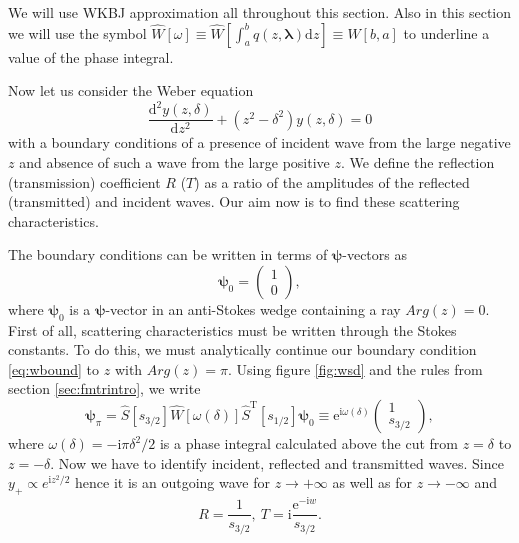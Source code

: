 \documentclass[atmp]{ipart_v1}
\def\rmd{\mathrm{d}}
\def\rme{\mathrm{e}}
\def\rmi{\mathrm{i}}
\def\lmbd{\bm{\lambda}}
\def\psii{\bm\psi}
\def\S{\widehat{S}}
\def\W{\widehat{W}}
\def\T{\mathrm{T}}
\def\w{\omega}
\newcommand\eref[1]{\eqref{#1}}
\newcommand\fref[1]{figure \ref{#1}}
\newcommand\sref[1]{section \ref{#1}}
\newcommand\phsintgrnd[1][z]{q(#1,\lmbd)}
\newcommand\phsintgrl[3][z]{\int_{#2}^{#3} \phsintgrnd[#1] \rmd #1}
\begin{document}
We will use WKBJ approximation all throughout this section. Also in this section we will use the symbol 
$\W[\w] \equiv \W \left[\phsintgrl{a}{b} \right] \equiv \W[b,a]$ to underline a value of the phase integral.

Now let us consider the Weber equation
\begin{equation}
\frac{\rmd^2 y(z,\delta)}{\rmd z^2}+(z^2-\delta^2)y(z,\delta)=0
\label{eq:weber}
\end{equation}
with a boundary conditions of a presence of incident wave from the large negative $z$ and absence of such 
a wave from the large positive $z$. We define the reflection (transmission) coefficient $R$ ($T$) as
a ratio of the amplitudes of the reflected (transmitted) and incident waves. 
Our aim now is to find these scattering characteristics.

The boundary conditions can be written in terms of $\psii$-vectors as
\begin{equation}
\psii_0 = \left(\begin{array}{*{2}{c}} 1 \\ 0 \end{array}\right),
\label{eq:wbound}
\end{equation}
where $\psii_0$ is a $\psii$-vector in an anti-Stokes wedge containing a ray $Arg(z)=0$.
First of all, scattering characteristics must be written through the 
Stokes constants. To do this, we must analytically continue our boundary 
condition \eref{eq:wbound} to $z$ with $Arg(z)=\pi$. 
Using \fref{fig:wsd} and the rules from \sref{sec:fmtrintro}, we write
\begin{equation}
\psii_{\pi} = 
\S \left[ s_{3/2} \right]
\W \left[ \w(\delta) \right] 
\S^{\T} \left[ s_{1/2} \right] \psii_0 \equiv 
\rme^{\rmi \w(\delta)} \left(\begin{array}{*{2}{c}} 1 \\ s_{3/2} \end{array}\right),
\end{equation}
where $\w(\delta)=-\rmi\pi\delta^2/2$ is a phase integral calculated above the cut 
from $z=\delta$ to $z=-\delta$. Now we have to identify incident, reflected and transmitted waves. 
Since $y_+ \propto e^{\rmi z^2/2}$ hence it is 
an outgoing wave for $z \rightarrow +\infty$ as well as for $z \rightarrow -\infty$ and
\begin{equation}
R = \frac{1}{s_{3/2}},\ T=\rmi\frac{\rme^{-\rmi w}}{s_{3/2}}.
\label{eq:RT}
\end{equation}
\end{document}
